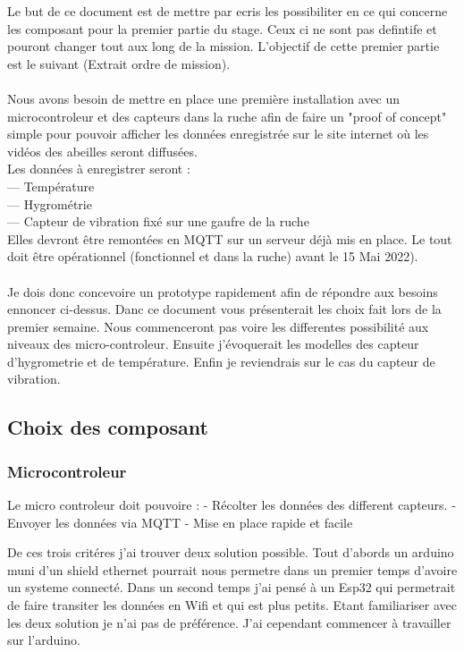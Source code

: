 \documentclass[5pt]{article}
\begin{document}
Le but de ce document est de mettre par ecris les possibiliter en ce qui concerne les composant pour la premier partie du stage. Ceux ci ne sont pas defintife et pouront changer tout aux long de la mission. L'objectif de cette premier partie est le suivant (Extrait ordre de mission).\\ 
\\
Nous avons besoin de mettre en place une première installation avec un microcontroleur et
des capteurs dans la ruche afin de faire un "proof of concept" simple pour pouvoir afficher les
données enregistrée sur le site internet où les vidéos des abeilles seront diffusées.\\
Les données à enregistrer seront :\\
— Température\\
— Hygrométrie\\
— Capteur de vibration fixé sur une gaufre de la ruche\\
Elles devront être remontées en MQTT sur un serveur déjà mis en place.
Le tout doit être opérationnel (fonctionnel et dans la ruche) avant le 15 Mai 2022).
\\
\\
Je dois donc concevoire un prototype rapidement afin de répondre aux besoins ennoncer ci-dessus.
Danc ce document vous présenterait les choix fait lors de la premier semaine. Nous commenceront pas voire les differentes possibilité aux niveaux des micro-controleur. Ensuite j'évoquerait les modelles des capteur d'hygrometrie et de température. Enfin je reviendrais sur le cas du capteur de vibration.

\newpage{}
\subsection{Choix des composant}

\subsubsection{Microcontroleur}
Le micro controleur doit pouvoire :
	- Récolter les données des different capteurs.
	- Envoyer les données via MQTT
	- Mise en place rapide et facile

De ces trois critéres j'ai trouver deux solution possible. 
Tout d'abords un arduino muni d'un shield ethernet pourrait nous permetre dans un premier temps d'avoire un systeme connecté.
Dans un second temps j'ai pensé à un Esp32 qui permetrait de faire transiter les données en Wifi et qui est plus petits. 
Etant familiariser avec les deux solution je n'ai pas de préférence. J'ai cependant commencer à travailler sur l'arduino.
\end{document}
